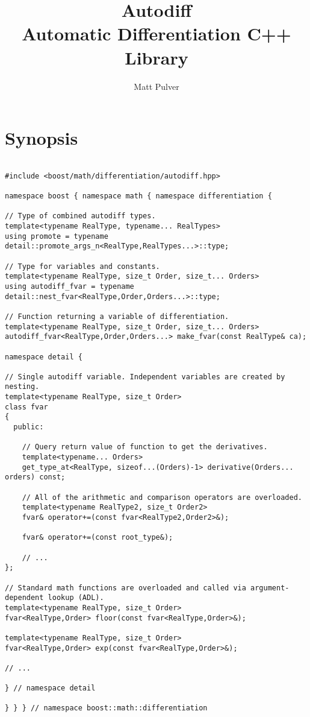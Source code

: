 \documentclass{article}
\begin{document}
\title{Autodiff \\ Automatic Differentiation C++ Library}
\author{Matt Pulver}
\maketitle



\section{Synopsis}

\begin{verbatim}

#include <boost/math/differentiation/autodiff.hpp>

namespace boost { namespace math { namespace differentiation {

// Type of combined autodiff types.
template<typename RealType, typename... RealTypes>
using promote = typename detail::promote_args_n<RealType,RealTypes...>::type;

// Type for variables and constants.
template<typename RealType, size_t Order, size_t... Orders>
using autodiff_fvar = typename detail::nest_fvar<RealType,Order,Orders...>::type;

// Function returning a variable of differentiation.
template<typename RealType, size_t Order, size_t... Orders>
autodiff_fvar<RealType,Order,Orders...> make_fvar(const RealType& ca);

namespace detail {

// Single autodiff variable. Independent variables are created by nesting.
template<typename RealType, size_t Order>
class fvar
{
  public:

    // Query return value of function to get the derivatives.
    template<typename... Orders>
    get_type_at<RealType, sizeof...(Orders)-1> derivative(Orders... orders) const;

    // All of the arithmetic and comparison operators are overloaded.
    template<typename RealType2, size_t Order2>
    fvar& operator+=(const fvar<RealType2,Order2>&);

    fvar& operator+=(const root_type&);

    // ...
};

// Standard math functions are overloaded and called via argument-dependent lookup (ADL).
template<typename RealType, size_t Order>
fvar<RealType,Order> floor(const fvar<RealType,Order>&);

template<typename RealType, size_t Order>
fvar<RealType,Order> exp(const fvar<RealType,Order>&);

// ...

} // namespace detail

} } } // namespace boost::math::differentiation
\end{verbatim}
\end{document}
